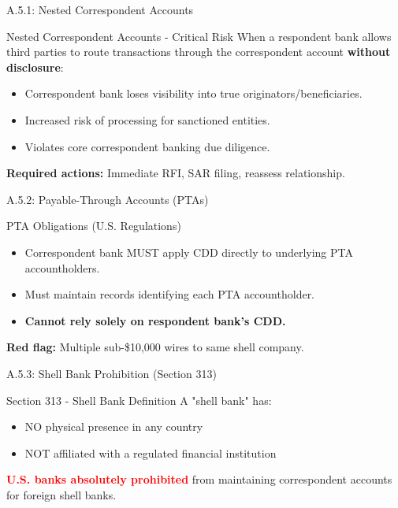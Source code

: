 \documentclass{beamer}
\begin{document}
	
	\begin{frame}{A.5.1: Nested Correspondent Accounts}
		\begin{block}{Nested Correspondent Accounts - Critical Risk}
			When a respondent bank allows third parties to route transactions through the correspondent account \textbf{without disclosure}:
			\begin{itemize}
				\item Correspondent bank loses visibility into true originators/beneficiaries.
				\item Increased risk of processing for sanctioned entities.
				\item Violates core correspondent banking due diligence.
			\end{itemize}
		\end{block}
		\textbf{Required actions:} Immediate RFI, SAR filing, reassess relationship.
	\end{frame}
	
	\begin{frame}{A.5.2: Payable-Through Accounts (PTAs)}
		\begin{block}{PTA Obligations (U.S. Regulations)}
			\begin{itemize}
				\item Correspondent bank MUST apply CDD directly to underlying PTA accountholders.
				\item Must maintain records identifying each PTA accountholder.
				\item \textbf{Cannot rely solely on respondent bank's CDD.}
			\end{itemize}
		\end{block}
		\textbf{Red flag:} Multiple sub-\$10,000 wires to same shell company.
	\end{frame}
	
	\begin{frame}{A.5.3: Shell Bank Prohibition (Section 313)}
		\begin{block}{Section 313 - Shell Bank Definition}
			A "shell bank" has:
			\begin{itemize}
				\item NO physical presence in any country
				\item NOT affiliated with a regulated financial institution
			\end{itemize}
		\end{block}
		\textcolor{red}{\textbf{U.S. banks absolutely prohibited}} from maintaining correspondent accounts for foreign shell banks.
	\end{frame}
	
\end{document}
